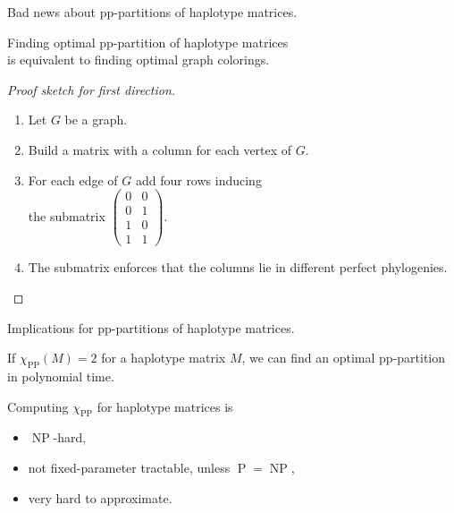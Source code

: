 \documentclass{beamer}
\begin{document}
\begin{frame}{Bad news about pp-partitions of haplotype matrices.}
  \begin{theorem}
    Finding \alert{optimal pp-partition of haplotype matrices}\\
    is equivalent to finding \alert{optimal graph colorings}.
  \end{theorem}

  \begin{proof}[Proof sketch for first direction]
    \begin{enumerate}
    \item Let $G$ be a graph.
    \item Build a matrix with a column for each vertex of $G$.
    \item For each edge of $G$ add four rows inducing\\the
      submatrix $\left(
        \begin{smallmatrix}
          0 & 0 \\
          0 & 1 \\
          1 & 0 \\
          1 & 1
        \end{smallmatrix}\right)$.
    \item The submatrix enforces that the columns lie in different
      perfect phylogenies. \qedhere  
    \end{enumerate}
  \end{proof}
\end{frame}

\begin{frame}{Implications for pp-partitions of haplotype matrices.}
  \begin{corollary}
    If $\chi_{\operatorname{PP}}(M) = 2$ for a haplotype matrix $M$,
    we can find an optimal pp-partition in polynomial time. 
  \end{corollary}

  \begin{corollary}
    Computing $\chi_{\operatorname{PP}}$ for haplotype matrices is
    \begin{itemize}
    \item $\operatorname{NP}$-hard,
    \item not fixed-parameter tractable, unless
      $\operatorname{P}=\operatorname{NP}$, 
    \item very hard to approximate.
    \end{itemize}
  \end{corollary}
\end{frame}
\end{document}

